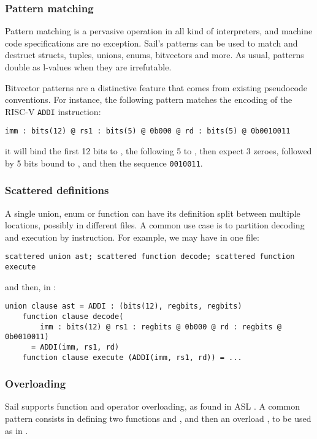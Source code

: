 \subsubsection{Pattern matching}

Pattern matching is a pervasive operation in all kind of interpreters, and machine code specifications are no exception. Sail's patterns can be used to match and destruct structs, tuples, unions, enums, bitvectors and more. As usual, patterns double as l-values when they are irrefutable.

Bitvector patterns are a distinctive feature that comes from existing pseudocode conventions. For instance, the following pattern matches the encoding of the RISC-V \texttt{ADDI} instruction:
\begin{lstlisting}[language=sail]
    imm : bits(12) @ rs1 : bits(5) @ 0b000 @ rd : bits(5) @ 0b0010011
\end{lstlisting}
it will bind the first 12 bits to , the following 5 to , then expect 3 zeroes, followed by 5 bits bound to , and then the sequence \texttt{0010011}.

\subsubsection{Scattered definitions}

A single union, enum or function can have its definition split between multiple locations, possibly in different files. A common use case is to partition decoding and execution by instruction. For example, we may have in one file:
\begin{lstlisting}[language=sail]
  scattered union ast; scattered function decode; scattered function execute
\end{lstlisting}
and then, in :
\begin{lstlisting}[language=sail]
    union clause ast = ADDI : (bits(12), regbits, regbits)
    function clause decode(
        imm : bits(12) @ rs1 : regbits @ 0b000 @ rd : regbits @ 0b0010011)
      = ADDI(imm, rs1, rd)
    function clause execute (ADDI(imm, rs1, rd)) = ...
\end{lstlisting}

\subsubsection{Overloading}

Sail supports function and operator overloading, as found \eg in ASL \cite{Reid2016}. A common pattern consists in defining two functions  and , and then an overload , to be used as in .

